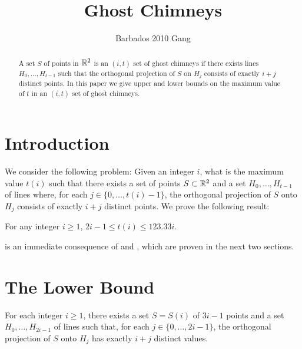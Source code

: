\documentclass{patmorin}
\title{Ghost Chimneys}
\author{Barbados 2010 Gang}
\begin{document}
\maketitle

\begin{abstract}
A set $S$ of points in $\mathbb{R}^2$ is an $(i,t)$ set of ghost chimneys
if there exists lines $H_0,\ldots,H_{t-1}$ such that the orthogonal
projection of $S$ on $H_j$ consists of exactly $i+j$ distinct points.
In this paper we give upper and lower bounds on the maximum value of $t$
in an $(i,t)$ set of ghost chimneys.
\end{abstract}

\section{Introduction}

We consider the following problem:  Given an integer $i$, what
is the maximum value $t(i)$ such that there exists a set of points
$S\subset\mathbb{R}^2$ and a set $H_0,\ldots,H_{t-1}$ of lines where, for each
$j\in\{0,\ldots,t(i)-1\}$, the orthogonal projection of $S$ onto $H_j$
consists of exactly $i+j$ distinct points.  We prove the following result:

\begin{thm}
For any integer $i\ge 1$,  $2i -1 \le t(i) \le 123.33i$.
\end{thm}

 is an immediate consequence of  and
, which are proven in the next two sections. 

\section{The Lower Bound}

\begin{lem}
For each integer $i\ge 1$, there exists a set $S=S(i)$ of $3i-1$
points and a set $H_0,\ldots,H_{2i-1}$ of lines such that, for each
$j\in\{0,\ldots,2i-1\}$, the orthogonal projection of $S$ onto $H_j$
has exactly $i+j$ distinct values.
\end{lem}
\end{document}
